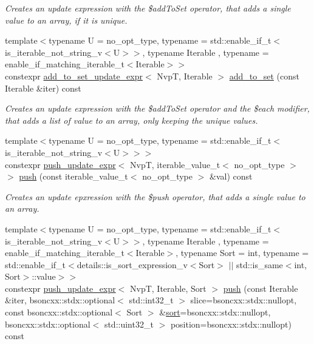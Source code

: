\begin{DoxyCompactItemize}
\begin{DoxyCompactList}\small\item\em Creates an update expression with the \$add\+To\+Set operator, that adds a single value to an array, if it is unique. \end{DoxyCompactList}\item 
{\footnotesize template$<$typename U  = no\+\_\+opt\+\_\+type, typename  = std\+::enable\+\_\+if\+\_\+t$<$is\+\_\+iterable\+\_\+not\+\_\+string\+\_\+v$<$\+U$>$$>$, typename Iterable , typename  = enable\+\_\+if\+\_\+matching\+\_\+iterable\+\_\+t$<$\+Iterable$>$$>$ }\\constexpr \hyperlink{classmongo__odm_1_1add__to__set__update__expr}{add\+\_\+to\+\_\+set\+\_\+update\+\_\+expr}$<$ NvpT, Iterable $>$ \hyperlink{classmongo__odm_1_1nvp__base_a9250b3abba132ae279fa55d94e52a91b}{add\+\_\+to\+\_\+set} (const Iterable \&iter) const 
\begin{DoxyCompactList}\small\item\em Creates an update expression with the \$add\+To\+Set operator and the \$each modifier, that adds a list of value to an array, only keeping the unique values. \end{DoxyCompactList}\item 
{\footnotesize template$<$typename U  = no\+\_\+opt\+\_\+type, typename  = std\+::enable\+\_\+if\+\_\+t$<$is\+\_\+iterable\+\_\+not\+\_\+string\+\_\+v$<$\+U$>$$>$$>$ }\\constexpr \hyperlink{classmongo__odm_1_1push__update__expr}{push\+\_\+update\+\_\+expr}$<$ NvpT, iterable\+\_\+value\+\_\+t$<$ no\+\_\+opt\+\_\+type $>$ $>$ \hyperlink{classmongo__odm_1_1nvp__base_a9627421e5a3cb1f86a2eed7809a0eff4}{push} (const iterable\+\_\+value\+\_\+t$<$ no\+\_\+opt\+\_\+type $>$ \&val) const 
\begin{DoxyCompactList}\small\item\em Creates an update epxression with the \$push operator, that adds a single value to an array. \end{DoxyCompactList}\item 
{\footnotesize template$<$typename U  = no\+\_\+opt\+\_\+type, typename  = std\+::enable\+\_\+if\+\_\+t$<$is\+\_\+iterable\+\_\+not\+\_\+string\+\_\+v$<$\+U$>$$>$, typename Iterable , typename  = enable\+\_\+if\+\_\+matching\+\_\+iterable\+\_\+t$<$\+Iterable$>$, typename Sort  = int, typename  = std\+::enable\+\_\+if\+\_\+t$<$details\+::is\+\_\+sort\+\_\+expression\+\_\+v$<$\+Sort$>$ $\vert$$\vert$                                          std\+::is\+\_\+same$<$int, Sort$>$\+::value$>$$>$ }\\constexpr \hyperlink{classmongo__odm_1_1push__update__expr}{push\+\_\+update\+\_\+expr}$<$ NvpT, Iterable, Sort $>$ \hyperlink{classmongo__odm_1_1nvp__base_a72ab9b7adaf6737ca8c5c9b3eb59953d}{push} (const Iterable \&iter, bsoncxx\+::stdx\+::optional$<$ std\+::int32\+\_\+t $>$ slice=bsoncxx\+::stdx\+::nullopt, const bsoncxx\+::stdx\+::optional$<$ Sort $>$ \&\hyperlink{classmongo__odm_1_1nvp__base_a6a8d165cfc00d3bcd70d16a2c704ae0e}{sort}=bsoncxx\+::stdx\+::nullopt, bsoncxx\+::stdx\+::optional$<$ std\+::uint32\+\_\+t $>$ position=bsoncxx\+::stdx\+::nullopt) const 

\end{DoxyCompactItemize}
